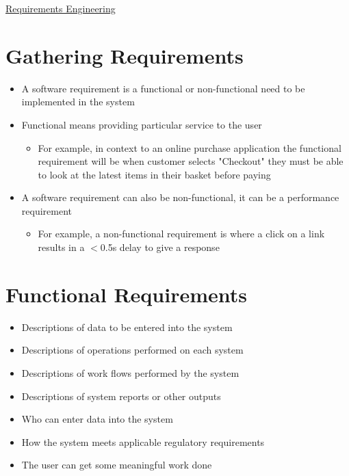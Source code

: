\documentclass{article}[18pt]
\begin{document}
\begin{center}
\underline{\huge Requirements Engineering}
\end{center}
\section{Gathering Requirements}
\begin{itemize}
	\item A software requirement is a functional or non-functional need to be implemented in the system
	\item Functional means providing particular service to the user
	\begin{itemize}
		\item For example, in context to an online purchase application the functional requirement will be when customer selects "Checkout" they must be able to look at the latest items in their basket before paying
	\end{itemize}
	\item A software requirement can also be non-functional, it can be a performance requirement
	\begin{itemize}
		\item For example, a non-functional requirement is where a click on a link results in a $<$0.5s delay to give a response
	\end{itemize}
\end{itemize}
\section{Functional Requirements}
\begin{itemize}
	\item Descriptions of data to be entered into the system
	\item Descriptions of operations performed on each system
	\item Descriptions of work flows performed by the system
	\item Descriptions of system reports or other outputs
	\item Who can enter data into the system
	\item How the system meets applicable regulatory requirements
	\item The user can get some meaningful work done
\end{itemize}
\end{document}
